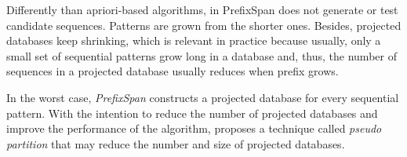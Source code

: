 Differently than apriori-based algorithms, in PrefixSpan does not generate or test candidate sequences. Patterns are grown from the shorter ones. Besides, projected databases keep shrinking, which is relevant in practice because usually, only a small set of
sequential patterns grow long in a database and, thus, the number of sequences in a projected database usually reduces when prefix grows.

In the worst case, \textit{PrefixSpan} constructs a projected database for every sequential pattern. With the intention to reduce the number of projected databases and improve the performance of the algorithm, \cite{Pei} proposes a technique called \textit{pseudo partition} that may reduce the number and size of projected databases.

